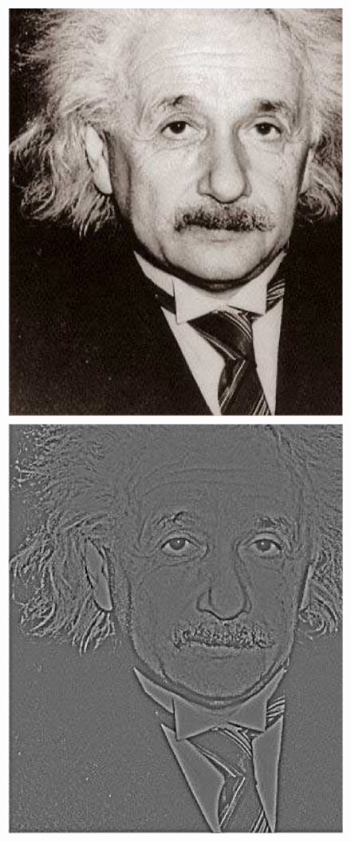 \begin{frame}[plain]
\begin{figure}[H]
    \centering
    \includegraphics[scale=0.25]{Imagenes/Einstein_01.eps}
    \includegraphics[scale=0.25]{Imagenes/Einstein_02.eps}
\end{figure}
\end{frame}
